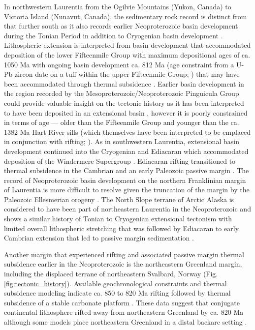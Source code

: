 \documentclass[twocolumn, switch]{article} %
\begin{document}
In northwestern Laurentia from the Ogilvie Mountains (Yukon, Canada) to Victoria Island (Nunavut, Canada), the sedimentary rock record is distinct from that further south as it also records earlier Neoproterozoic basin development during the Tonian Period in addition to Cryogenian basin development \citep{Macdonald2012a}. Lithospheric extension is interpreted from basin development that accommodated deposition of the lower Fifteenmile Group with maximum depositional ages of ca. 1050 Ma with ongoing basin development ca. 812 Ma (age constraint from a U-Pb zircon date on a tuff within the upper Fifteenmile Group; \citealp{Macdonald2010a}) that may have been accommodated through thermal subsidence \citep{Macdonald2012a}. Earlier basin development in the region recorded by the Mesoproterozoic/Neoproterozoic Pinguicula Group could provide valuable insight on the tectonic history as it has been interpreted to have been deposited in an extensional basin \citep{Medig2016a}, however it is poorly constrained in terms of age --- older than the Fifteenmile Group and younger than the ca. 1382 Ma Hart River sills (which themselves have been interpreted to be emplaced in conjunction with rifting; \citealp{Verbaas2018a}). As in southwestern Laurentia, extensional basin development continued into the Cryogenian and Ediacaran which accommodated deposition of the Windermere Supergroup \citep{Moynihan2019a}. Ediacaran rifting transitioned to thermal subsidence in the Cambrian and an early Paleozoic passive margin \citep{Moynihan2019a}. The record of Neoproterozoic basin development on the northern Franklinian margin of Laurentia is more difficult to resolve given the truncation of the margin by the Paleozoic Ellesmerian orogeny \citep{Cocks2011a}. The North Slope terrane of Arctic Alaska is considered to have been part of northeastern Laurentia in the Neoproterozoic and shows a similar history of Tonian to Cryogenian extensional tectonism with limited overall lithospheric stretching that was followed by Ediacaran to early Cambrian extension that led to passive margin sedimentation \citep{Strauss2019a}. 

Another margin that experienced rifting and associated passive margin thermal subsidence earlier in the Neoproterozoic is the northeastern Greenland margin, including the displaced terrane of northeastern Svalbard, Norway (Fig. \ref{fig:tectonic_history}). Available geochronological constraints and thermal subsidence modeling indicate ca. 850 to 820 Ma rifting followed by thermal subsidence of a stable carbonate platform \citep{Maloof2006a, Sonderholm2008a, Halverson2018a}. These data suggest that conjugate continental lithosphere rifted away from northeastern Greenland by ca. 820 Ma although some models place northeastern Greenland in a distal backarc setting \citep{Malone2014a}.
\end{document}
